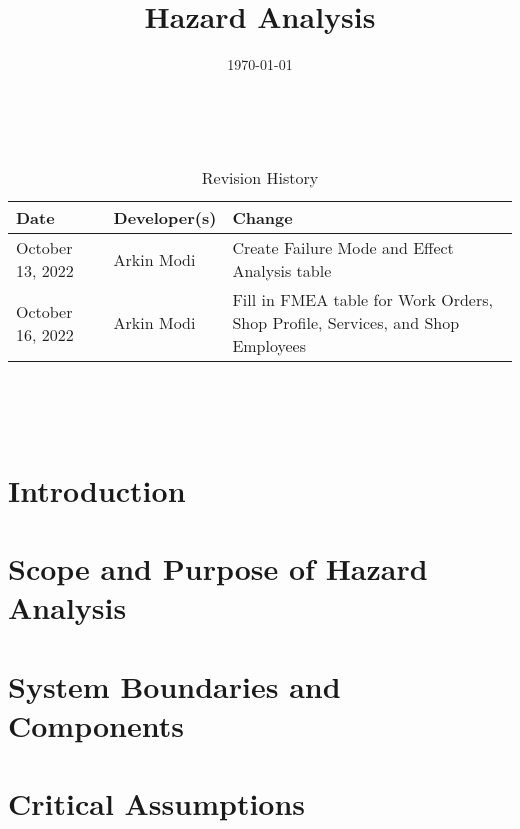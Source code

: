 \documentclass{article}
\title{Hazard Analysis\\\progname}
\author{\authname}
\date{\today}
\begin{document}
\maketitle
\thispagestyle{empty}

~\newpage


\begin{table}[hp]
	\caption{Revision History} \label{TblRevisionHistory}
	\begin{tabularx}{\textwidth}{llX}
		\toprule
		\textbf{Date}    & \textbf{Developer(s)} & \textbf{Change}                                                                \\
		\midrule
		October 13, 2022 & Arkin Modi            & Create Failure Mode and Effect Analysis table                                  \\
		October 16, 2022 & Arkin Modi            & Fill in FMEA table for Work Orders, Shop Profile, Services, and Shop Employees \\
		\bottomrule
	\end{tabularx}
\end{table}

~\newpage

\tableofcontents

~\newpage



\section{Introduction}


\section{Scope and Purpose of Hazard Analysis}

\section{System Boundaries and Components}

\section{Critical Assumptions}

\end{document}
